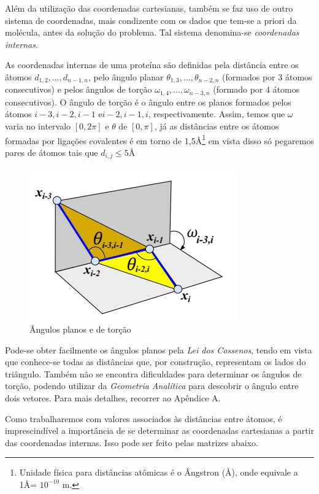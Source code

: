 \documentclass[a4paper,12pt]{article}
\begin{document}
	Além da utilização das coordenadas cartesianas, também se faz uso de outro sistema de coordenadas, mais condizente com os dados que tem-se a priori da molécula, antes da solução do problema. Tal sistema denomina-se \textit{coordenadas internas}.
	
	As coordenadas internas de uma proteína são definidas pela distância entre os átomos $d_{1,2}, ..., d_{n - 1,n}$, pelo ângulo planar $\theta_{1,3}, ...,\theta_{n - 2,n}$ (formados por 3 átomos consecutivos) e pelos ângulos de torção $\omega_{1,4}, ..., \omega_{n-3,n}$ (formado por 4 átomos consecutivos). O ângulo de torção é o ângulo entre os planos formados pelos átomos $i-3,i-2,i-1$ e$i-2,i-1,i$, respectivamente. Assim, temos que $\omega$ varia no intervalo $[0,2\pi]$ e $\theta$ de $[0,\pi]$, já as distâncias entre os átomos formadas por ligações covalentes é em torno de 1,5\AA\footnote[1]{Unidade física para distâncias atômicas é o Ângstron (\AA), onde equivale a 1\AA = $10^{-10}$ m.} em vista disso só pegaremos pares de átomos tais que $d_{i,j}\leq 5 $\AA 
	\\
	
	\begin{figure}[H]
		\begin{center}
			\includegraphics[width=0.6\linewidth]{Capturar.PNG}
		\end{center}
		\caption{Ângulos planos e de torção}
		\label{}
	\end{figure}
	
	Pode-se obter facilmente os ângulos planos pela \textit{Lei dos Cossenos}, tendo em vista que conhece-se todas as distâncias que, por construção, representam os lados do triângulo. Também não se encontra dificuldades para determinar os ângulos de torção, podendo utilizar da \textit{Geometria Analítica} para descobrir o ângulo entre dois vetores. Para mais detalhes, recorrer ao Apêndice A.
	
	Como trabalharemos com valores associados às distâncias entre átomos, é imprescindível a importância de se determinar as coordenadas cartesianas a partir das coordenadas internas. Isso pode ser feito pelas matrizes abaixo.
	
\end{document}
